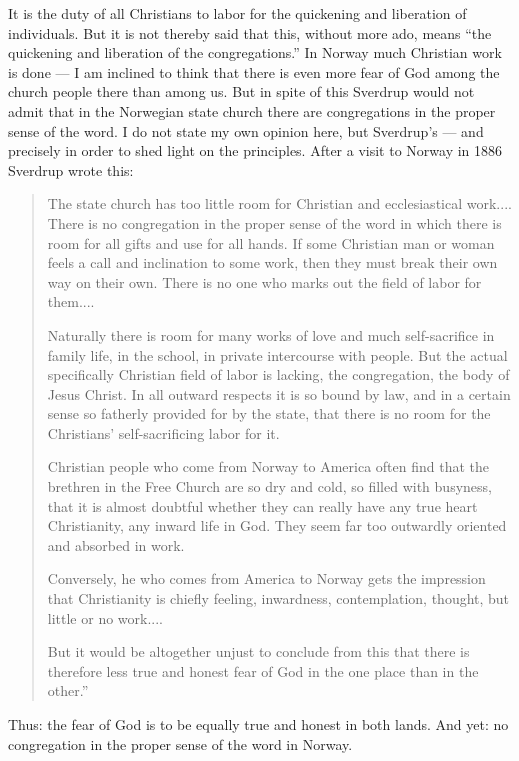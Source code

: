 It is the duty of all Christians to labor for the quickening and liberation of individuals. But it is not thereby said that this, without more ado, means “the quickening and liberation of the congregations.” In Norway much Christian work is done — I am inclined to think that there is even more fear of God among the church people there than among us. But in spite of this Sverdrup would not admit that in the Norwegian state church there are congregations in the proper sense of the word. I do not state my own opinion here, but Sverdrup’s — and precisely in order to shed light on the principles. After a visit to Norway in 1886 Sverdrup wrote this:

\begin{quote}
The state church has too little room for Christian and ecclesiastical work.... There is no congregation in the proper sense of the word in which there is room for all gifts and use for all hands. If some Christian man or woman feels a call and inclination to some work, then they must break their own way on their own. There is no one who marks out the field of labor for them....

Naturally there is room for many works of love and much self-sacrifice in family life, in the school, in private intercourse with people. But the actual specifically Christian field of labor is lacking, the congregation, the body of Jesus Christ. In all outward respects it is so bound by law, and in a certain sense so fatherly provided for by the state, that there is no room for the Christians’ self-sacrificing labor for it.

Christian people who come from Norway to America often find that the brethren in the Free Church are so dry and cold, so filled with busyness, that it is almost doubtful whether they can really have any true heart Christianity, any inward life in God. They seem far too outwardly oriented and absorbed in work.

Conversely, he who comes from America to Norway gets the impression that Christianity is chiefly feeling, inwardness, contemplation, thought, but little or no work....

But it would be altogether unjust to conclude from this that there is therefore less true and honest fear of God in the one place than in the other.”
\end{quote}

Thus: the fear of God is to be equally true and honest in both lands. And yet: no congregation in the proper sense of the word in Norway.


